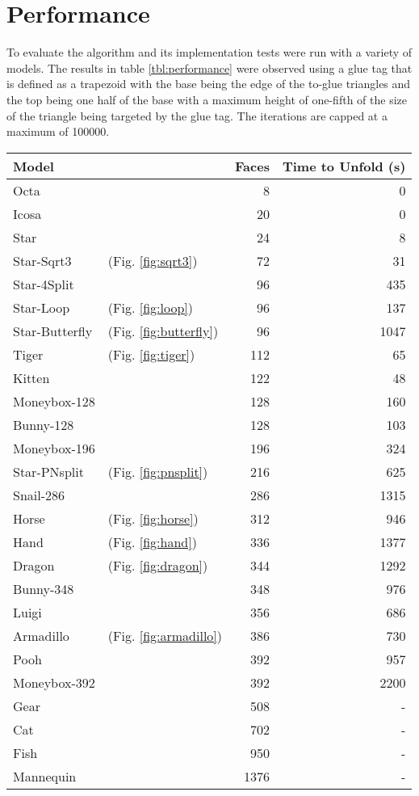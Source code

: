 \documentclass[draft,final]{vutinfth} %
\begin{document}
\section{Performance}
\label{sec:performance}

To evaluate the algorithm and its implementation tests were run with a variety of models. The results in table \ref{tbl:performance} were observed using a glue tag that is defined as a trapezoid with the base being the edge of the to-glue triangles and the top being one half of the base with a maximum height of one-fifth of the size of the triangle being targeted by the glue tag. The iterations are capped at a maximum of 100000.

\begingroup
\centering
\begin{tabular}{|ll|r|r|}
\hline
Model & & Faces & Time to Unfold (s) \\
\hline
Octa & & 8 & 0 \\
Icosa & & 20 & 0 \\
Star & & 24 & 8 \\
Star-Sqrt3 & (Fig. \ref{fig:sqrt3}) & 72 & 31 \\
Star-4Split & & 96 & 435 \\
Star-Loop & (Fig. \ref{fig:loop}) & 96 & 137 \\
Star-Butterfly & (Fig. \ref{fig:butterfly}) & 96 & 1047 \\
Tiger & (Fig. \ref{fig:tiger}) & 112 & 65 \\
Kitten & & 122 & 48 \\
Moneybox-128 & & 128 & 160 \\
Bunny-128 & & 128 & 103 \\
Moneybox-196 & & 196 & 324 \\
Star-PNsplit & (Fig. \ref{fig:pnsplit}) & 216 & 625 \\
Snail-286 & & 286 & 1315 \\
Horse & (Fig. \ref{fig:horse}) & 312 & 946 \\
Hand & (Fig. \ref{fig:hand}) & 336 & 1377 \\
Dragon & (Fig. \ref{fig:dragon}) & 344 & 1292 \\
Bunny-348 & & 348 & 976 \\
Luigi & & 356 & 686 \\
Armadillo & (Fig. \ref{fig:armadillo}) & 386 & 730 \\
Pooh & & 392 & 957 \\
Moneybox-392 & & 392 & 2200 \\
Gear & & 508 & - \\
Cat & & 702 & - \\
Fish & & 950 & - \\
Mannequin & & 1376 & - \\
\hline
\end{tabular}
\end{document}
